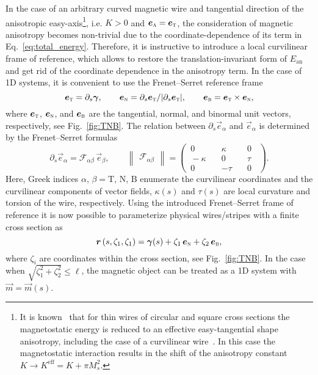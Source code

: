 In the case of an arbitrary curved magnetic wire and tangential direction of the anisotropic easy-axis\footnote{It is known~\cite{Hillebrands06} that for thin wires of circular and square cross sections the magnetostatic energy is reduced to an effective easy-tangential shape anisotropy, including the case of a curvilinear wire~\cite{Slastikov12}. In this case the magnetostatic interaction results in the shift of the anisotropy constant $K\to K^\text{eff} = K + \pi M_s^2$.}, i.e. $K>0$ and $\vec{e}_\textsc{a} = \vec{e}_\textsc{t}$, the consideration of magnetic anisotropy becomes non-trivial due to the coordinate-dependence of its term in Eq.~\eqref{eq:total_energy}. Therefore, it is instructive to introduce a local curvilinear frame of reference, which allows to restore the translation-invariant form of $E_\textrm{an}$ and get rid of the coordinate dependence in the anisotropy term. In the case of 1D systems, it is convenient to use the Frenet--Serret reference frame  
\begin{equation} \label{eq:Frenet-Serret}
\vec{e}_\textsc{t} =\partial_s \vec{\gamma}, \qquad  \vec{e}_\textsc{n} =\partial_s \vec{e}_\textsc{t}/|\partial_s \vec{e}_\textsc{t}| , \qquad  \vec{e}_\textsc{b} = \vec{e}_\textsc{t} \times \vec{e}_\textsc{n},
\end{equation}
where $\vec{e}_\textsc{t}$, $\vec{e}_\textsc{n}$, and $\vec{e}_\textsc{b}$ are the tangential, normal, and binormal unit vectors, respectively, see Fig.~\ref{fig:TNB}. The relation between $\partial_s\vec{e}_{\alpha}$ and $\vec{e}_{\alpha}$ is determined by the Frenet--Serret formulas~\cite{Kreyszig91}
\begin{equation} \label{eq:FrenetSerret_basis}
\partial_s\vec{e}_{\alpha} = \mathcal{F}_{\alpha \beta} \, \vec{e}_{\beta}, \qquad \begin{Vmatrix} \mathcal{F}_{\alpha \beta} \end{Vmatrix} = \left(\begin{matrix*} \, 0 \quad	& \kappa \quad &  0 \, \, \, \\ \, -\kappa \quad & 0 \quad & \tau \, \, \, \\
\, 0 \quad & -\tau \quad &	0 \, \, \,
\end{matrix*}\right).	
\end{equation}
Here, Greek indices $\alpha,\, \beta = \textrm{T},\, \textrm{N},\, \textrm{B}$ enumerate the curvilinear coordinates and the curvilinear components of vector fields, $\kappa(s)$ and $\tau(s)$ are local curvature and torsion of the wire, respectively. Using the introduced Frenet--Serret frame of reference it is now possible to parameterize physical wires/stripes with a finite cross section as
\begin{equation} \label{eq:Stripe_param}
\vec{r}\left(s,\zeta_1,\zeta_1\right)=\vec{\gamma}(s) + \zeta_1 \, \vec{e}_\textsc{n}+\zeta_2 \, \vec{e}_\textsc{b},
\end{equation}
where $\zeta_i$ are coordinates within the cross section, see Fig.~\ref{fig:TNB}. In the case when $\sqrt{\zeta_1^2+\zeta_2^2}\leq \ell$, the magnetic object can be treated as a 1D system with~$\vec{m}=\vec{m}(s)$.

